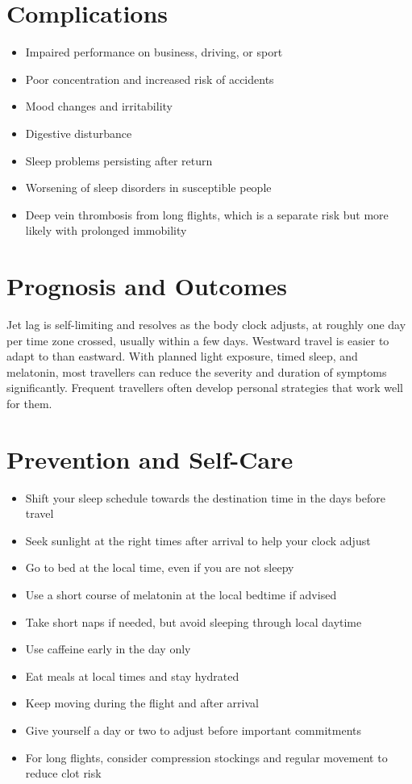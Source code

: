 \section*{Complications}
\begin{itemize}
    \item Impaired performance on business, driving, or sport
    \item Poor concentration and increased risk of accidents
    \item Mood changes and irritability
    \item Digestive disturbance
    \item Sleep problems persisting after return
    \item Worsening of sleep disorders in susceptible people
    \item Deep vein thrombosis from long flights, which is a separate risk but more likely with prolonged immobility
\end{itemize}

\section*{Prognosis and Outcomes}
Jet lag is self-limiting and resolves as the body clock adjusts, at roughly one day per time zone crossed, usually within a few days. Westward travel is easier to adapt to than eastward. With planned light exposure, timed sleep, and melatonin, most travellers can reduce the severity and duration of symptoms significantly. Frequent travellers often develop personal strategies that work well for them.

\section*{Prevention and Self-Care}
\begin{itemize}
    \item Shift your sleep schedule towards the destination time in the days before travel
    \item Seek sunlight at the right times after arrival to help your clock adjust
    \item Go to bed at the local time, even if you are not sleepy
    \item Use a short course of melatonin at the local bedtime if advised
    \item Take short naps if needed, but avoid sleeping through local daytime
    \item Use caffeine early in the day only
    \item Eat meals at local times and stay hydrated
    \item Keep moving during the flight and after arrival
    \item Give yourself a day or two to adjust before important commitments
    \item For long flights, consider compression stockings and regular movement to reduce clot risk
\end{itemize}

